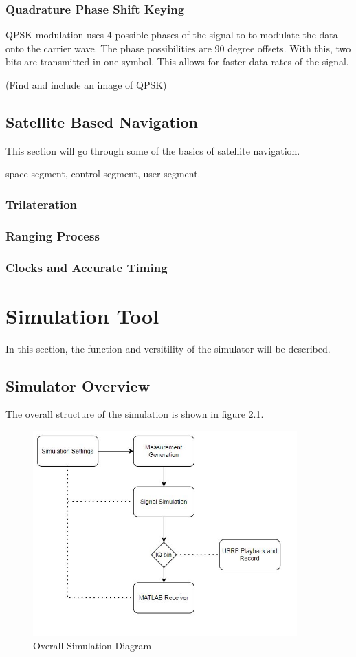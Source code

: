 \documentclass[12pt]{report}
\begin{document}
\subsection{Quadrature Phase Shift Keying}

QPSK modulation uses 4 possible phases of the signal to to modulate the data onto the carrier wave. The phase possibilities are 90 degree offsets. With this, two bits are transmitted in one symbol. This allows for faster data rates of the signal. 

(Find and include an image of QPSK)

\section{Satellite Based Navigation}\label{sec:satellitenav}
This section will go through some of the basics of satellite navigation. 

space segment, control segment, user segment. 

\subsection{Trilateration}
\subsection{Ranging Process}
\subsection{Clocks and Accurate Timing}


\chapter {Simulation Tool}
In this section, the function and versitility of the simulator will be described.

\section{Simulator Overview}

The overall structure of the simulation is shown in figure \ref{fig:SimDiagram}.
\begin{figure}[ht]
    \centering
    \includegraphics[width=4.0in]{OverallSimulationDiagram}
    \caption{Overall Simulation Diagram}
    \label{fig:SimDiagram}
\end{figure}
\end{document}

